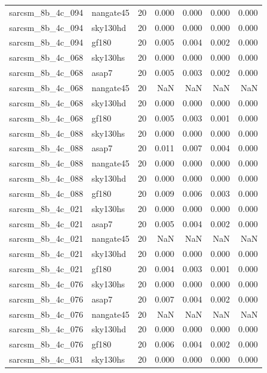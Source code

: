 \begin{tabular}{llrrrrr}
sarcsm\_8b\_4c\_094 & nangate45 & 20 & 0.000 & 0.000 & 0.000 & 0.000 \\
sarcsm\_8b\_4c\_094 & sky130hd & 20 & 0.000 & 0.000 & 0.000 & 0.000 \\
sarcsm\_8b\_4c\_094 & gf180 & 20 & 0.005 & 0.004 & 0.002 & 0.000 \\
sarcsm\_8b\_4c\_068 & sky130hs & 20 & 0.000 & 0.000 & 0.000 & 0.000 \\
sarcsm\_8b\_4c\_068 & asap7 & 20 & 0.005 & 0.003 & 0.002 & 0.000 \\
sarcsm\_8b\_4c\_068 & nangate45 & 20 & NaN & NaN & NaN & NaN \\
sarcsm\_8b\_4c\_068 & sky130hd & 20 & 0.000 & 0.000 & 0.000 & 0.000 \\
sarcsm\_8b\_4c\_068 & gf180 & 20 & 0.005 & 0.003 & 0.001 & 0.000 \\
sarcsm\_8b\_4c\_088 & sky130hs & 20 & 0.000 & 0.000 & 0.000 & 0.000 \\
sarcsm\_8b\_4c\_088 & asap7 & 20 & 0.011 & 0.007 & 0.004 & 0.000 \\
sarcsm\_8b\_4c\_088 & nangate45 & 20 & 0.000 & 0.000 & 0.000 & 0.000 \\
sarcsm\_8b\_4c\_088 & sky130hd & 20 & 0.000 & 0.000 & 0.000 & 0.000 \\
sarcsm\_8b\_4c\_088 & gf180 & 20 & 0.009 & 0.006 & 0.003 & 0.000 \\
sarcsm\_8b\_4c\_021 & sky130hs & 20 & 0.000 & 0.000 & 0.000 & 0.000 \\
sarcsm\_8b\_4c\_021 & asap7 & 20 & 0.005 & 0.004 & 0.002 & 0.000 \\
sarcsm\_8b\_4c\_021 & nangate45 & 20 & NaN & NaN & NaN & NaN \\
sarcsm\_8b\_4c\_021 & sky130hd & 20 & 0.000 & 0.000 & 0.000 & 0.000 \\
sarcsm\_8b\_4c\_021 & gf180 & 20 & 0.004 & 0.003 & 0.001 & 0.000 \\
sarcsm\_8b\_4c\_076 & sky130hs & 20 & 0.000 & 0.000 & 0.000 & 0.000 \\
sarcsm\_8b\_4c\_076 & asap7 & 20 & 0.007 & 0.004 & 0.002 & 0.000 \\
sarcsm\_8b\_4c\_076 & nangate45 & 20 & NaN & NaN & NaN & NaN \\
sarcsm\_8b\_4c\_076 & sky130hd & 20 & 0.000 & 0.000 & 0.000 & 0.000 \\
sarcsm\_8b\_4c\_076 & gf180 & 20 & 0.006 & 0.004 & 0.002 & 0.000 \\
sarcsm\_8b\_4c\_031 & sky130hs & 20 & 0.000 & 0.000 & 0.000 & 0.000 \\

\end{tabular}
